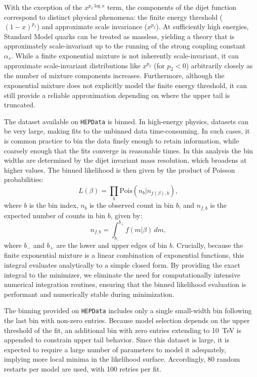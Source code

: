 \documentclass[a4paper,11pt]{article}
\begin{document}
With the exception of the $x^{p_3\log x}$ term, the components of the dijet function correspond to distinct physical phenomena: the finite energy threshold ($(1-x)^{p_1}$) and approximate scale invariance ($x^{p_2}$). At sufficiently high energies, Standard Model quarks can be treated as massless, yielding a theory that is approximately scale-invariant up to the running of the strong coupling constant $\alpha_s$. While a finite exponential mixture is not inherently scale-invariant, it can approximate scale-invariant distributions like $x^{p_2}$ (for $p_2<0$) arbitrarily closely as the number of mixture components increases. Furthermore, although the exponential mixture does not explicitly model the finite energy threshold, it can still provide a reliable approximation depending on where the upper tail is truncated.

The dataset available on \texttt{HEPData} is binned. In high-energy physics, datasets can be very large, making fits to the unbinned data time-consuming. In such cases, it is common practice to bin the data finely enough to retain information, while coarsely enough that the fits converge in reasonable times.
In this analysis the bin widths are determined by the dijet invariant mass resolution, which broadens at higher 
values.
The binned likelihood is then given by the product of Poisson probabilities:
\begin{equation}
    L(\beta) = \prod_b \text{Pois}(n_b|n_{f(\beta),b}),
\end{equation}
where $b$ is the bin index, $n_b$ is the observed count in bin $b$, and $n_{f,b}$ is the 
expected number of counts in bin $b$, given by:
\begin{equation}
    n_{f,b} = \int_{b_-}^{b_+} f(m|\beta)\,dm,
\end{equation}
where $b_-$ and $b_+$ are the lower and upper edges of bin $b$. Crucially, because the finite exponential mixture is a linear combination of exponential functions, this integral evaluates analytically to a simple closed form. By providing the exact integral to the minimizer, we eliminate the need for computationally intensive numerical integration routines, ensuring that the binned likelihood evaluation is performant and numerically stable during minimization.

The binning provided on \texttt{HEPData} includes only a single small-width bin following the 
last bin with non-zero entries.
Because model selection depends on the upper threshold of the fit, an additional bin with zero 
entries extending to 10~TeV is appended to constrain upper tail behavior.
Since this dataset is large, it is expected to require a large number of parameters to model it 
adequately, implying more local minima in the likelihood surface.
Accordingly, 80 random restarts per model are used, with 100 retries per fit.
\end{document}
